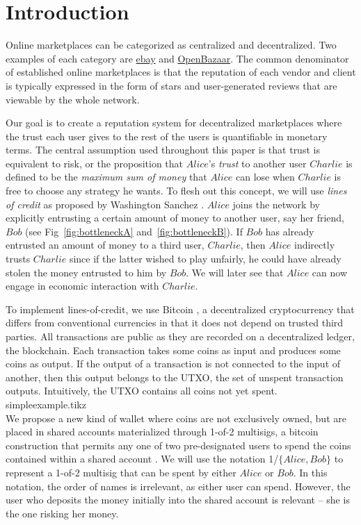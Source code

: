 \section{Introduction}
  Online marketplaces can be categorized as centralized and decentralized.
  Two examples of each category are \href{http://www.ebay.com}{ebay} and \href{https://openbazaar.org/}{OpenBazaar}.
  The common denominator of established online marketplaces is that the reputation of each vendor and client is typically
  expressed in the form of stars and user-generated reviews that are viewable by the whole network.

  Our goal is to create a reputation system for decentralized marketplaces where the trust each user gives to the rest of
  the users is quantifiable in monetary terms. The central assumption used throughout this paper is that trust is equivalent
  to risk, or the proposition that $Alice$'s \textit{trust} to another user $Charlie$ is defined to be the \textit{maximum sum
  of money} that $Alice$ can lose when $Charlie$ is free to choose any strategy he wants. To flesh out this concept, we will
  use \textit{lines of credit} as proposed by Washington Sanchez \cite{loc}. $Alice$ joins the network by explicitly
  entrusting a certain amount of money to another user, say her friend, $Bob$ (see Fig~\ref{fig:bottleneckA}
  and~\ref{fig:bottleneckB}). If $Bob$ has already entrusted an amount of money to a third user, $Charlie$, then $Alice$
  indirectly trusts $Charlie$ since if the latter wished to play unfairly, he could have already stolen the money entrusted to
  him by $Bob$. We will later see that $Alice$ can now engage in economic interaction with $Charlie$.

  To implement lines-of-credit, we use Bitcoin \cite{bitcoin}, a decentralized cryptocurrency that differs from conventional
  currencies in that it does not depend on trusted third parties. All transactions are public as they are recorded on a
  decentralized ledger, the blockchain. Each transaction takes some coins as input and produces some coins as output. If the
  output of a transaction is not connected to the input of another, then this output belongs to the UTXO, the set of unspent
  transaction outputs. Intuitively, the UTXO contains all coins not yet spent.
  \medskip \ \\
  {simpleexample.tikz} \smallskip \ \\
  We propose a new kind of wallet where coins are not exclusively owned, but are placed in shared accounts materialized
  through 1-of-2 multisigs, a bitcoin construction that permits any one of two pre-designated users to spend the coins
  contained within a shared account \cite{masteringbitcoin}. We will use the notation 1/$\{Alice, Bob\}$ to represent a
  1-of-2 multisig that can be spent by either $Alice$ or $Bob$. In this notation, the order of names is irrelevant, as
  either user can spend. However, the user who deposits the money initially into the shared account is relevant -- she is the
  one risking her money.

